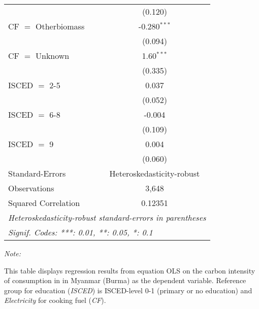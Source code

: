 \begin{table}[htbp!]
\begin{adjustbox}{width = 1\textwidth, max height = 0.95\textheight, center}
\begin{threeparttable}[b]
\begin{tabular}{lc}
                                & (0.120)\\   
            CF $=$ Otherbiomass & -0.280$^{***}$\\   
                                & (0.094)\\   
            CF $=$ Unknown      & 1.60$^{***}$\\   
                                & (0.335)\\   
            ISCED $=$ 2-5       & 0.037\\   
                                & (0.052)\\   
            ISCED $=$ 6-8       & -0.004\\   
                                & (0.109)\\   
            ISCED $=$ 9         & 0.004\\   
                                & (0.060)\\   
            \midrule 
            Standard-Errors     & Heteroskedasticity-robust \\   
            Observations        & 3,648\\  
            Squared Correlation & 0.12351\\  
            \midrule \midrule
            \multicolumn{2}{l}{\emph{Heteroskedasticity-robust standard-errors in parentheses}}\\
            \multicolumn{2}{l}{\emph{Signif. Codes: ***: 0.01, **: 0.05, *: 0.1}}\\
         \end{tabular}
         
         \begin{tablenotes}\item \medskip \textit{Note:}
            \item This table displays regression results from equation OLS on the carbon intensity of consumption in  in Myanmar (Burma) as the dependent variable. Reference group for education (\textit{ISCED}) is ISCED-level 0-1 (primary or no education) and \textit{Electricity} for cooking fuel (\textit{CF}).
         \end{tablenotes}
      \end{threeparttable}
   \end{adjustbox}
\end{table}


